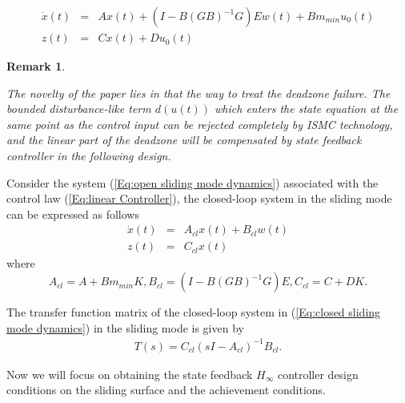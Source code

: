 \documentclass[journal,onecolumn]{IEEEtran}
\newtheorem{rem}{Remark}
\begin{document}
\begin{equation}
\label{Eq:open sliding mode dynamics}
\begin{array}{rcl}
   \dot{x}(t)&=&Ax(t)+(I-B{(GB)}^{-1}G)Ew(t)+B{m_{min}}u_0(t)

\\[1mm]
   z(t)&=& Cx(t)+Du_0(t)
\end{array}
\end{equation}


\begin{rem}\label{re2}

The novelty of the paper lies in that the way to treat the deadzone
failure. The bounded disturbance-like term $d(u(t))$ which enters
the state equation at the same point as the control input can be
rejected completely by ISMC technology, and the linear part of the
deadzone will be compensated by state feedback controller in the
following design.

\end{rem}

 Consider the system
(\ref{Eq:open sliding mode dynamics}) associated with the control
law (\ref{Eq:linear Controller}), the closed-loop system in the
sliding mode can be expressed as follows
\begin{equation}
\label{Eq:closed sliding mode dynamics}
\begin{array}{rcl}
 \dot{x}(t)&=&A_{cl}x(t)+B_{cl}w(t)\\[1mm]
  z(t)&=&C_{cl}x(t)
\end{array}
\end{equation}
where
\begin{equation*}
A_{cl}=A+B{m_{min}}K, B_{cl}=(I-B{(GB)}^{-1}G)E, C_{cl}=C+DK.
\end{equation*}


The transfer function matrix of the closed-loop system in
(\ref{Eq:closed sliding mode dynamics}) in the sliding mode is given
by
\begin{equation}
\label{EQ:Tran form}
\begin{array}{l}
T(s)=C_{cl}(sI-A_{cl})^{-1}B_{cl}.
\end{array}
\end{equation}






Now we will focus on obtaining the state feedback $H_{\infty}$
controller design conditions on the sliding surface and the
achievement conditions.
\end{document}
